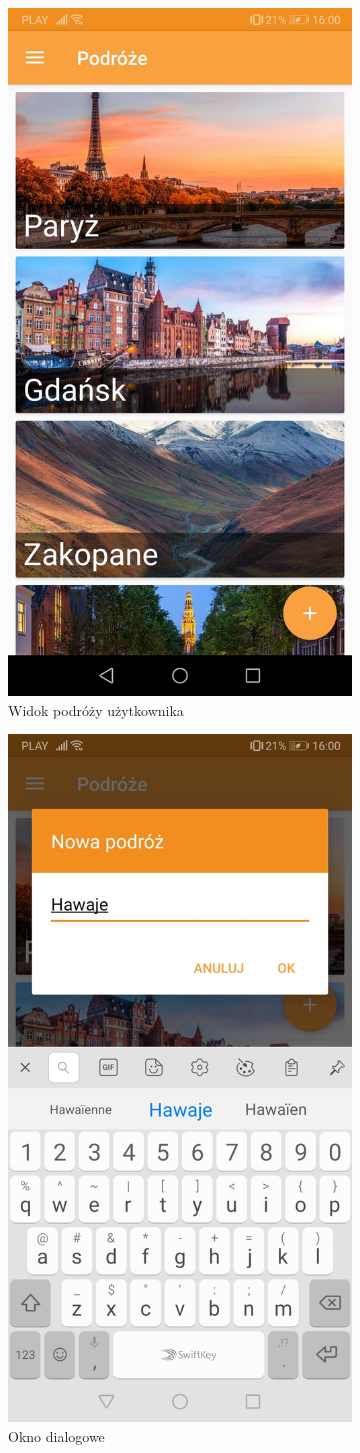 \documentclass[10pt,twoside,a4paper]{report}
\begin{document}
\begin{figure}[h]
\centering
\begin{subfigure}{0.3\textwidth}
\centering
\includegraphics[width=0.8\linewidth, width=5cm]{travelsView}
\caption{Widok podróży użytkownika}
\label{fig:travelsView}
\end{subfigure}
\begin{subfigure}{0.3\textwidth}
\centering
\includegraphics[width=0.8\linewidth, width=5cm]{createNewTravel}
\caption{Okno dialogowe}
\label{fig:createNewTravel}
\end{subfigure}
\begin{subfigure}{0.3\textwidth}
\centering

\end{subfigure}
\end{figure}
\end{document}
